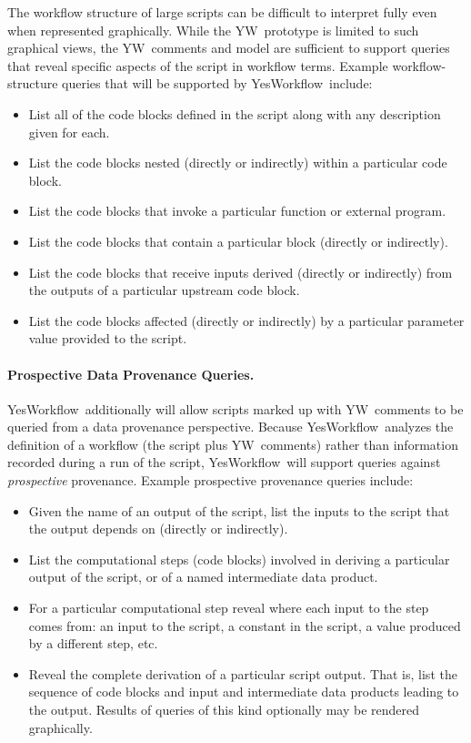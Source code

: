 \documentclass[15]{ijdc-v9}
\newcommand{\YW}{\textsf{YesWorkflow}}
\newcommand{\yw}{\textsf{YW}}
\begin{document}
The workflow structure of large scripts can be difficult to interpret
fully even when represented graphically.  While the \yw\
prototype is limited to such graphical views, the \yw\ comments and
model are sufficient to support queries that reveal specific aspects
of the script in workflow terms.  Example
workflow-structure queries that will be supported by \YW\ include:
%
\begin{itemize}
\item List all of the code blocks defined in the script along with any description given for each.
\item List the code blocks nested (directly or indirectly) within a particular code block.
\item List the code blocks that invoke a particular function or external program.
\item List the code blocks that contain a particular block (directly or indirectly).
\item List the code blocks that receive inputs derived (directly or indirectly) from the outputs of a particular upstream code block.
\item List the code blocks affected (directly or indirectly) by a particular parameter value provided to the script.
\end{itemize}

\paragraph{Prospective Data Provenance Queries.}
\YW\ additionally will allow scripts
marked up with \yw\ comments to be queried from a data provenance
perspective. Because \YW\ analyzes the definition of a workflow (the
script plus \yw\ comments) rather than information recorded during a
run of the script,  \YW\ will support queries
against \emph{prospective} provenance.
%
Example prospective provenance queries include:
\begin{itemize}
\item Given the name of an output of the script, list the inputs to
  the script that the output depends on (directly or indirectly). 
\item List the computational steps (code blocks) involved in deriving
  a particular output of the script, or of a named intermediate data
  product. 
\item For a particular computational step reveal where each input to
  the step comes from: an input to the script, a constant in the
  script, a value produced by a different step, etc. 
\item Reveal the complete derivation of a particular script output.
  That is, list the sequence of code blocks and input and intermediate
  data products leading to the output. Results of queries of this kind
  optionally may be rendered graphically. 
\end{itemize}
\end{document}
